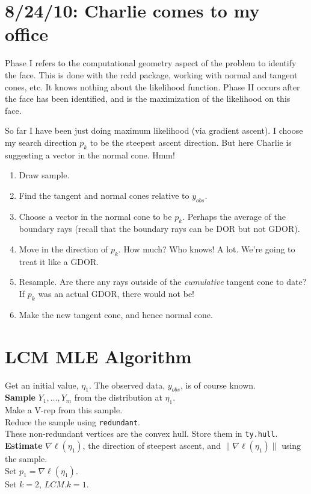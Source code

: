 \documentclass{amsbook}
\theoremstyle{definition}
\theoremstyle{remark}
\begin{document}
\section{8/24/10: Charlie comes to my office}
Phase I refers to the computational 
geometry aspect of the problem to identify the face.  This is done with the rcdd 
package, working with normal and tangent cones, etc.  It knows nothing about 
the likelihood function.  Phase II occurs after the face has been identified, and is 
the maximization of the likelihood on this face.

So far I have been just doing maximum likelihood (via gradient ascent).  I choose my 
search direction $p_k$ to be the steepest ascent direction.  But here Charlie is 
suggesting a vector in the normal cone.  Hmm!  
\begin{enumerate}
\item Draw sample.
\item Find the tangent and normal cones relative to $y_{obs}$.  
\item Choose a vector in the normal cone to be $p_k$.  Perhaps the average of the 
boundary rays (recall that the boundary rays can be DOR but not GDOR).
\item Move in the direction of $p_k$.  How much?  Who knows!  A lot.  We're going to 
treat it like a GDOR.
\item Resample.  Are there any rays outside of the \emph{cumulative} tangent cone to 
date?  If $p_k$ was an actual GDOR, there would not be!  
\item Make the new tangent cone, and hence normal cone.  
\end{enumerate}

\newpage
\section{LCM MLE Algorithm}
\noindent Get an initial value, $\eta_1$.  The observed data, $y_{obs}$, is of course known.\\ 
\textbf{Sample} $Y_1, \ldots, Y_m$ from the distribution at $\eta_{1}$.\\
Make a V-rep from this sample.\\
Reduce the sample using \texttt{redundant}.\\
These non-redundant vertices are the convex hull. Store them in \texttt{ty.hull}.\\

\noindent \textbf{Estimate} $\nabla \ell( \eta_1)$, the direction of steepest ascent, and $\lVert \nabla \ell( \eta_1) \rVert$ using the sample.\\
Set $p_1 = \nabla \ell( \eta_1)$. \\
Set $k=2$, $LCM.k=1$. \\
\end{document}
